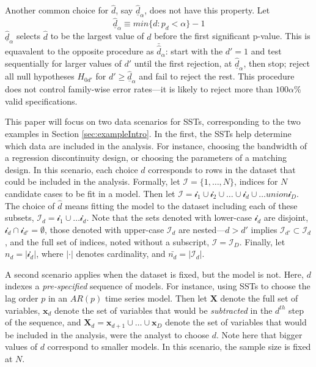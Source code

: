 \documentclass[12pt]{article}\usepackage[]{graphicx}\usepackage[]{color}
\newcommand{\dalphaU}{\bar{\hat{d}}_\alpha}
\newcommand{\dalphaB}{\underline{\hat{d}}_\alpha}
\begin{document}
Another common choice for $\hat{d}$, say $\dalphaB$,
does not have this property.
Let
\begin{equation}
\dalphaB\equiv min\{d: p_d<\alpha\}-1
\end{equation}
$\dalphaB$ selects $\hat{d}$ to be the largest value of $d$ before the first
significant p-value.
This is equavalent to the opposite procedure as $\dalphaU$: start with the $d'=1$
and test sequentially for larger values of $d'$ until the first
rejection, at $\dalphaB$, then stop; reject all null
hypotheses $H_{0d'}$ for $d'\ge \dalphaB$ and fail to
reject the rest.
This procedure does not control family-wise error rates---it is likely
to reject more than $100\alpha$\% valid specifications.

This paper will focus on two data scenarios for SSTs, corresponding to
the two examples in Section \ref{sec:exampleIntro}.
In the first, the SSTs help determine which data are included in the
analysis.
For instance, choosing the bandwidth of a regression discontinuity
design, or choosing the parameters of a matching design.
In this scenario, each choice $d$ corresponds to rows in the dataset
that could be included in the analysis.
Formally, let $\mathcal{I}=\{1,\dots,N\}$, indices for $N$ candidate
cases to be fit in a model.
Then let $\mathcal{I}=\mathcal{i}_1\cup\mathcal{i}_2\cup\dots\cup
\mathcal{i}_d \cup \dots union \mathcal{i}_D$.
The choice of $\hat{d}$ means fitting the model to the dataset
including each of these subsets,
$\mathcal{I}_d=\mathcal{i}_1\cup\dots\mathcal{i}_d$.
Note that the sets denoted with lower-case $\mathcal{i}_d$ are disjoint,
$\mathcal{i}_d \cap \mathcal{i}_{d'}=\emptyset$,
those denoted with upper-case $\mathcal{I}_d$ are nested---$d>d'$
implies $\mathcal{I}_{d'}\subset \mathcal{I}_d$, and the full set of
indices, noted without a subscript, $\mathcal{I}=\mathcal{I}_D$.
Finally, let $n_d=|\mathcal{i}_d|$, where $|\cdot |$ denotes
cardinality, and $\bar{n_d}=|\mathcal{I}_d |$.

A second scenario applies when the dataset is fixed, but the model is
not.
Here, $d$ indexes a \emph{pre-specified} sequence of models.
For instance, using SSTs to choose the lag order $p$ in an $AR(p)$
time series model.
Then let $\bm{X}$ denote the full set of variables, $\bm{x}_d$ denote
the set of variables that would be \emph{subtracted} in the $d^{th}$ step
of the sequence, and $\bm{X}_d=\bm{x}_{d+1} \cup \dots \cup \bm{x}_D$
denote the set of variables that would be included in the analysis,
were the analyst to choose $d$.
Note here that bigger values of $d$ correspond to smaller models.
In this scenario, the sample size is fixed at $N$.
\end{document}
